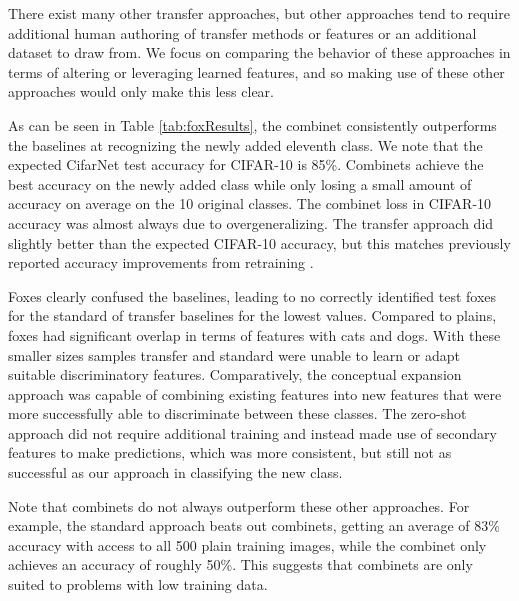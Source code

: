 \documentclass[letterpaper]{article}
\begin{document}
There exist many other transfer approaches, but other approaches tend to require additional human authoring of transfer methods or features or an additional dataset to draw from. 
We focus on comparing the behavior of these approaches in terms of altering or leveraging learned features, and so making use of these other approaches would only make this less clear.

As can be seen in Table \ref{tab:foxResults}, the combinet consistently outperforms the baselines at recognizing the newly added eleventh class. 
We note that the expected CifarNet test accuracy for CIFAR-10 is 85\%. 
Combinets achieve the best accuracy on the newly added class while only losing a small amount of accuracy on average on the 10 original classes.
The combinet loss in CIFAR-10 accuracy was almost always due to overgeneralizing. 
The transfer approach did slightly better than the expected CIFAR-10 accuracy, but this matches previously reported accuracy improvements from retraining \cite{furlanello2017born}. 

Foxes clearly confused the baselines, leading to no correctly identified test foxes for the standard of transfer baselines for the lowest values. Compared to plains, foxes had significant overlap in terms of features with cats and dogs. With these smaller sizes samples transfer and standard were unable to learn or adapt suitable discriminatory features. Comparatively, the conceptual expansion approach was capable of combining existing features into new features that were more successfully able to discriminate between these classes. The zero-shot approach did not require additional training and instead made use of secondary features to make predictions, which was more consistent, but still not as successful as our approach in classifying the new class.

Note that combinets do not always outperform these other approaches. For example, the standard approach beats out combinets, getting an average of 83\% accuracy with access to all 500 plain training images, while the combinet only achieves an accuracy of roughly 50\%. This suggests that combinets are only suited to problems with low training data.
\end{document}
